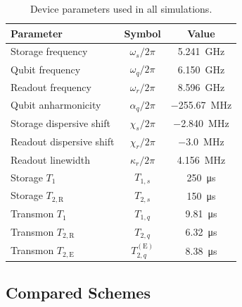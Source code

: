 \documentclass[aps,pra,twocolumn,reprint,floatfix,amsmath,amssymb]{revtex4-2}
\begin{document}
\begin{table}[t]
\caption{Device parameters used in all simulations.}
\label{tab:device}
\begin{tabular}{lcc}
\toprule
Parameter & Symbol & Value \\
\midrule
Storage frequency          & $\omega_s / 2\pi$       & \SI{5.241}{\GHz}   \\
Qubit frequency            & $\omega_q / 2\pi$       & \SI{6.150}{\GHz}   \\
Readout frequency          & $\omega_r / 2\pi$       & \SI{8.596}{\GHz}   \\
Qubit anharmonicity        & $\alpha_q / 2\pi$       & \SI{-255.67}{\MHz} \\
Storage dispersive shift   & $\chi_s / 2\pi$         & \SI{-2.840}{\MHz}  \\
Readout dispersive shift   & $\chi_r / 2\pi$         & \SI{-3.0}{\MHz}    \\
Readout linewidth          & $\kappa_r / 2\pi$       & \SI{4.156}{\MHz}   \\
Storage $T_1$              & $T_{1,s}$               & \SI{250}{\us}      \\
Storage $T_{2,\mathrm{R}}$ & $T_{2,s}$               & \SI{150}{\us}      \\
Transmon $T_1$             & $T_{1,q}$               & \SI{9.81}{\us}     \\
Transmon $T_{2,\mathrm{R}}$& $T_{2,q}$               & \SI{6.32}{\us}     \\
Transmon $T_{2,\mathrm{E}}$& $T_{2,q}^{(\mathrm{E})}$ & \SI{8.38}{\us}     \\
\bottomrule
\end{tabular}
\end{table}

\subsection{Compared Schemes}
\label{sec:schemes}
\end{document}
